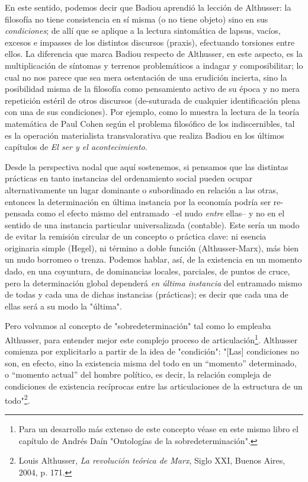\documentclass{book}
\begin{document}
En este sentido, podemos decir que Badiou aprendió la lección de
Althusser: la filosofía no tiene consistencia en sí misma (o no tiene
objeto) sino en sus \emph{condiciones}; de allí que se aplique a la
lectura sintomática de lapsus, vacíos, excesos e impasses de los
distintos discursos (praxis), efectuando torsiones entre ellos. La
diferencia que marca Badiou respecto de Althusser, en este aspecto, es
la multiplicación de síntomas y terrenos problemáticos a indagar y
composibilitar; lo cual no nos parece que sea mera ostentación de una
erudición incierta, sino la posibilidad misma de la filosofía como
pensamiento activo de su época y no mera repetición estéril de otros
discursos (de-suturada de cualquier identificación plena con una de sus
condiciones). Por ejemplo, como lo muestra la lectura de la teoría
matemática de Paul Cohen según el problema filosófico de los
indiscernibles, tal es la operación materialista transvalorativa que
realiza Badiou en los últimos capítulos de \emph{El ser y el
acontecimiento}.

Desde la perspectiva nodal que aquí sostenemos, si pensamos que las
distintas prácticas en tanto instancias del ordenamiento social pueden
ocupar alternativamente un lugar dominante o subordinado en relación a
las otras, entonces la determinación en última instancia por la economía
podría ser re-pensada como el efecto mismo del entramado --el nudo
\emph{entre} ellas-- y no en el sentido de una instancia particular
universalizada (contable). Este sería un modo de evitar la remisión
circular de un concepto o práctica clave: ni esencia originaria simple
(Hegel), ni término a doble función (Althusser-Marx), más bien un nudo
borromeo o trenza. Podemos hablar, así, de la existencia en un momento
dado, en una coyuntura, de dominancias locales, parciales, de puntos de
cruce, pero la determinación global dependerá \emph{en última instancia}
del entramado mismo de todas y cada una de dichas instancias
(prácticas); es decir que cada una de ellas será a su modo la "última".

Pero volvamos al concepto de "sobredeterminación" tal como lo empleaba
Althusser, para entender mejor este complejo proceso de
articulación\footnote{Para un desarrollo más extenso de este concepto
  véase en este mismo libro el capítulo de Andrés Daín "Ontologías de la
  sobredeterminación".}. Althusser comienza por explicitarlo a partir de
la idea de "condición": "{[}Las{]} condiciones no son, en efecto, sino
la existencia misma del todo en un ``momento'' determinado, o ``momento
actual'' del hombre político, es decir, la relación compleja de
condiciones de existencia recíprocas entre las articulaciones de la
estructura de un todo"\footnote{Louis Althusser, \emph{La revolución
  teórica de Marx}, Siglo XXI, Buenos Aires, 2004, p. 171.}.
\end{document}
